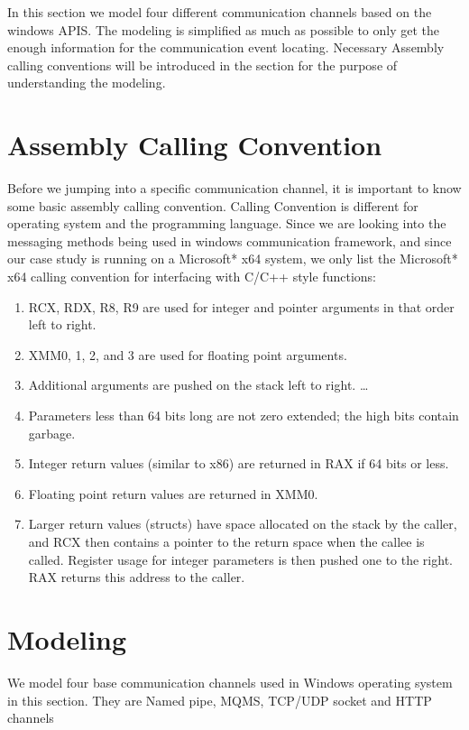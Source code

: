 \label{chapter:Bac}

In this section we model four different communication channels based on the windows APIS. The modeling is simplified as much as possible to only get the enough information for the communication event locating. Necessary Assembly calling conventions will be introduced in the section for the purpose of understanding the modeling.

\section{Assembly Calling Convention}
Before we jumping into a specific communication channel, it is important to know some basic assembly calling convention.
Calling Convention is different for operating system and the programming language. Since we are looking into the messaging methods being used in windows communication framework, and since our case study is running on a Microsoft* x64 system, we only list the Microsoft* x64 calling convention for interfacing with C/C++ style functions:\par
\begin{enumerate}  
\item RCX, RDX, R8, R9 are used for integer and pointer arguments in that order left to right.
\item XMM0, 1, 2, and 3 are used for floating point arguments.
\item Additional arguments are pushed on the stack left to right. \ldots 
\item Parameters less than 64 bits long are not zero extended; the high bits contain garbage.
\item Integer return values (similar to x86) are returned in RAX if 64 bits or less.
\item Floating point return values are returned in XMM0.
\item Larger return values (structs) have space allocated on the stack by the caller, and RCX then contains a pointer to the return space when the callee is called. Register usage for integer parameters is then pushed one to the right. RAX returns this address to the caller.
\end{enumerate}

\section{Modeling}
We model four base communication channels used in Windows operating system in this section. They are Named pipe, MQMS, TCP/UDP socket and HTTP channels
